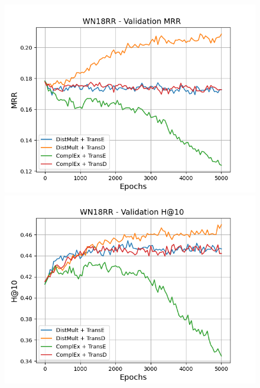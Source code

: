 \begin{figure}
    \centering
    \begin{minipage}{.45\textwidth}
      \centering
      \includegraphics[width=0.9\linewidth]{figures/results/gan_train/pretrained/uncertainty/max/entropy/wn18rr/5k_epochs/uncertainty_wn18rr_mrrs.png}
    \end{minipage}%
    \begin{minipage}{.45\textwidth}
      \centering
      \includegraphics[width=0.9\linewidth]{figures/results/gan_train/pretrained/uncertainty/max/entropy/wn18rr/5k_epochs/uncertainty_wn18rr_hit10.png}
    \end{minipage}
    

\end{figure}
